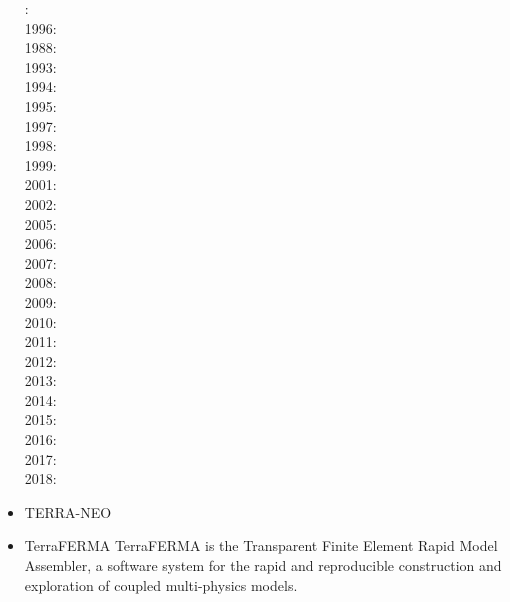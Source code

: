 \begin{itemize}
{\small
{}: \cite{baum83}\\
1996: \cite{buri96}\\
1988: \cite{glat88}\\
1993: \cite{tasg93}\\
1994: \cite{tasg94}\\
1995: \cite{buba95}\\
1997: \cite{burb97}\cite{yang97}\\
1998: \cite{burl98}\\
1999: \cite{tabg99}\cite{ribr99}\\
2001: \cite{buda01}\cite{burm01}\cite{dabu01}\\
2002: \cite{burb02}\\
2005: \cite{phbu05}\\
2006: \cite{dabu06}\\
2007: \cite{phbu07}\\
2008: \cite{heib08}\cite{shlj08}\\
2009: \cite{phbs09}\cite{wodd09}\cite{gows09}\cite{iabu09}\cite{scbs09}\cite{scbs09b}
      \cite{scbr09}\cite{oebm09}\\
2010: \cite{yayh10}\\
2011: \cite{woda11}\cite{iahb11}\\
2012: \cite{dagd12}\cite{shbs12}\\
2013: \cite{dadb13}\cite{oflb13}\\
2014: \cite{butm14}\\
2015: \cite{amsb15}\cite{cobs15}\\
2016: \cite{vade16}\cite{necg16}\\
2017: \cite{woda17}\\
2018: \cite{ghbu18}\cite{cogb18}
}

\item {\codefont TERRA-NEO} 

\cite{wegg15}


\item {\codefont TerraFERMA} 
TerraFERMA is the Transparent Finite Element Rapid Model Assembler, a software system for the rapid and reproducible construction and exploration of coupled multi-physics models.


\end{itemize}
